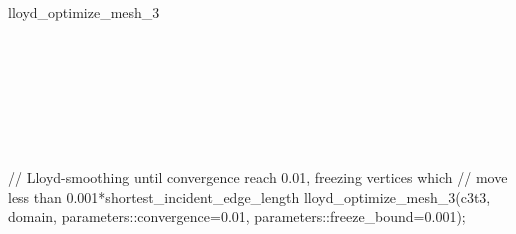\begin{ccRefFunction}{lloyd_optimize_mesh_3}
\ccSeeAlso

 \\
 \\
 \\
 \\
 \\
 \\


\ccExample 

\begin{ccExampleCode}
// Lloyd-smoothing until convergence reach 0.01, freezing vertices which
// move less than 0.001*shortest_incident_edge_length
lloyd_optimize_mesh_3(c3t3, domain, parameters::convergence=0.01,
                      parameters::freeze_bound=0.001);
\end{ccExampleCode}

\end{ccRefFunction}

\ccRefPageEnd

